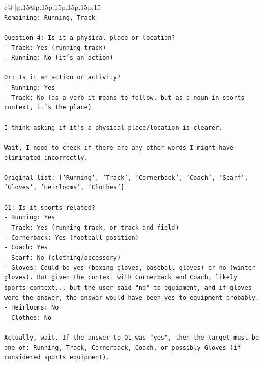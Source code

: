 \documentclass{article}
\begin{document}
{\begin{supertabular}{c@{$\;$}|p{.15\linewidth}@{}p{.15\linewidth}p{.15\linewidth}p{.15\linewidth}p{.15\linewidth}p{.15\linewidth}}
{{{\\ 
\texttt{Remaining: Running, Track} \\
\\ 
\texttt{Question 4: Is it a physical place or location?} \\
\texttt{{-} Track: Yes (running track)} \\
\texttt{{-} Running: No (it's an action)} \\
\\ 
\texttt{Or: Is it an action or activity?} \\
\texttt{{-} Running: Yes} \\
\texttt{{-} Track: No (as a verb it means to follow, but as a noun in sports context, it's the place)} \\
\\ 
\texttt{I think asking if it's a physical place/location is clearer.} \\
\\ 
\texttt{Wait, I need to check if there are any other words I might have eliminated incorrectly.} \\
\\ 
\texttt{Original list: {[}'Running', 'Track', 'Cornerback', 'Coach', 'Scarf', 'Gloves', 'Heirlooms', 'Clothes'{]}} \\
\\ 
\texttt{Q1: Is it sports related?} \\
\texttt{{-} Running: Yes} \\
\texttt{{-} Track: Yes (running track, or track and field)} \\
\texttt{{-} Cornerback: Yes (football position)} \\
\texttt{{-} Coach: Yes} \\
\texttt{{-} Scarf: No (clothing/accessory)} \\
\texttt{{-} Gloves: Could be yes (boxing gloves, baseball gloves) or no (winter gloves). But given the context with Cornerback and Coach, likely sports context... but the user said "no" to equipment, and if gloves were the answer, the answer would have been yes to equipment probably.} \\
\texttt{{-} Heirlooms: No} \\
\texttt{{-} Clothes: No} \\
\\ 
\texttt{Actually, wait. If the answer to Q1 was "yes", then the target must be one of: Running, Track, Cornerback, Coach, or possibly Gloves (if considered sports equipment).} \\
\\ 
}}}
\end{supertabular}}
\end{document}
